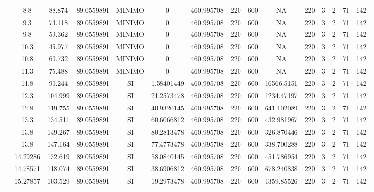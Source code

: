 \begin{table}[H]
{\begin{tabular}{|c|c|c|c|c|c|c|c|c|c|c|c|c|c|c|}
\cline{2-15}    & 8.8 & 88.874 & 89.0559891 & MINIMO & 0   & 460.995708 & 220 & 600 & NA  & 220 & 3   & 2   & 71  & 142 \bigstrut\\
\cline{2-15}    & 9.3 & 74.118 & 89.0559891 & MINIMO & 0   & 460.995708 & 220 & 600 & NA  & 220 & 3   & 2   & 71  & 142 \bigstrut\\
\cline{2-15}    & 9.8 & 59.362 & 89.0559891 & MINIMO & 0   & 460.995708 & 220 & 600 & NA  & 220 & 3   & 2   & 71  & 142 \bigstrut\\
\cline{2-15}    & 10.3 & 45.977 & 89.0559891 & MINIMO & 0   & 460.995708 & 220 & 600 & NA  & 220 & 3   & 2   & 71  & 142 \bigstrut\\
\cline{2-15}    & 10.8 & 60.732 & 89.0559891 & MINIMO & 0   & 460.995708 & 220 & 600 & NA  & 220 & 3   & 2   & 71  & 142 \bigstrut\\
\cline{2-15}    & 11.3 & 75.488 & 89.0559891 & MINIMO & 0   & 460.995708 & 220 & 600 & NA  & 220 & 3   & 2   & 71  & 142 \bigstrut\\
\cline{2-15}    & 11.8 & 90.244 & 89.0559891 & SI  & 1.58401449 & 460.995708 & 220 & 600 & 16566.5151 & 220 & 3   & 2   & 71  & 142 \bigstrut\\
\cline{2-15}    & 12.3 & 104.999 & 89.0559891 & SI  & 21.2573478 & 460.995708 & 220 & 600 & 1234.47197 & 220 & 3   & 2   & 71  & 142 \bigstrut\\
\cline{2-15}    & 12.8 & 119.755 & 89.0559891 & SI  & 40.9320145 & 460.995708 & 220 & 600 & 641.102089 & 220 & 3   & 2   & 71  & 142 \bigstrut\\
\cline{2-15}    & 13.3 & 134.511 & 89.0559891 & SI  & 60.6066812 & 460.995708 & 220 & 600 & 432.981967 & 220 & 3   & 2   & 71  & 142 \bigstrut\\
\cline{2-15}    & 13.8 & 149.267 & 89.0559891 & SI  & 80.2813478 & 460.995708 & 220 & 600 & 326.870446 & 220 & 3   & 2   & 71  & 142 \bigstrut\\
\cline{2-15}    & 13.8 & 147.164 & 89.0559891 & SI  & 77.4773478 & 460.995708 & 220 & 600 & 338.700288 & 220 & 3   & 2   & 71  & 142 \bigstrut\\
\cline{2-15}    & 14.29286 & 132.619 & 89.0559891 & SI  & 58.0840145 & 460.995708 & 220 & 600 & 451.786954 & 220 & 3   & 2   & 71  & 142 \bigstrut\\
\cline{2-15}    & 14.78571 & 118.074 & 89.0559891 & SI  & 38.6906812 & 460.995708 & 220 & 600 & 678.240838 & 220 & 3   & 2   & 71  & 142 \bigstrut\\
\cline{2-15}    & 15.27857 & 103.529 & 89.0559891 & SI  & 19.2973478 & 460.995708 & 220 & 600 & 1359.85526 & 220 & 3   & 2   & 71  & 142 \bigstrut\\

\end{tabular}}
\end{table}
